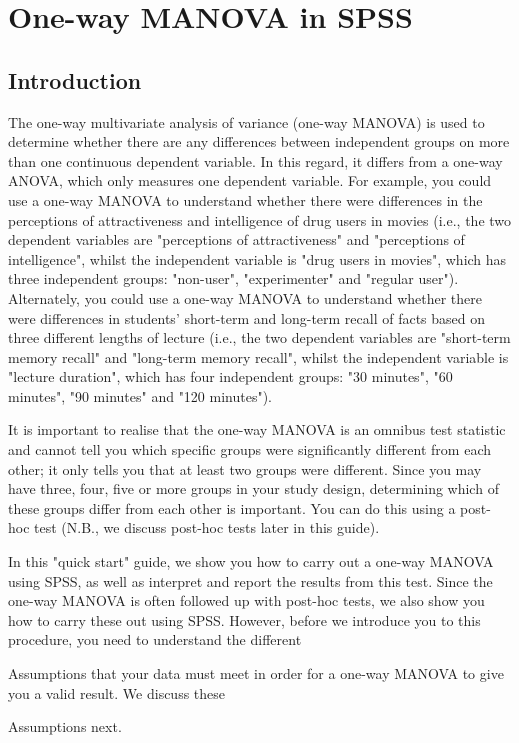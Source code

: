 \section{One-way MANOVA in SPSS}

\subsection{Introduction}
The one-way multivariate analysis of variance (one-way MANOVA) is used to determine whether there are any differences between independent groups on more than one continuous dependent variable. In this regard, it differs from a one-way ANOVA, which only measures one dependent variable. For example, you could use a one-way MANOVA to understand whether there were differences in the perceptions of attractiveness and intelligence of drug users in movies (i.e., the two dependent variables are "perceptions of attractiveness" and "perceptions of intelligence", whilst the independent variable is "drug users in movies", which has three independent groups: "non-user", "experimenter" and "regular user"). Alternately, you could use a one-way MANOVA to understand whether there were differences in students' short-term and long-term recall of facts based on three different lengths of lecture (i.e., the two dependent variables are "short-term memory recall" and "long-term memory recall", whilst the independent variable is "lecture duration", which has four independent groups: "30 minutes", "60 minutes", "90 minutes" and "120 minutes").

It is important to realise that the one-way MANOVA is an omnibus test statistic and cannot tell you which specific groups were significantly different from each other; it only tells you that at least two groups were different. Since you may have three, four, five or more groups in your study design, determining which of these groups differ from each other is important. You can do this using a post-hoc test (N.B., we discuss post-hoc tests later in this guide).

In this "quick start" guide, we show you how to carry out a one-way MANOVA using SPSS, as well as interpret and report the results from this test. Since the one-way MANOVA is often followed up with post-hoc tests, we also show you how to carry these out using SPSS. However, before we introduce you to this procedure, you need to understand the different \item Assumptions that your data must meet in order for a one-way MANOVA to give you a valid result. We discuss these \item Assumptions next.


